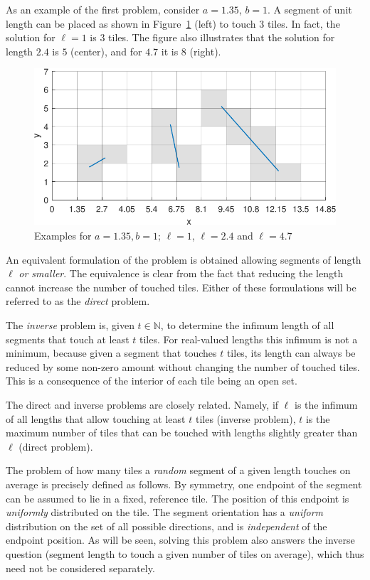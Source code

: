 \documentclass[12pt, a4paper]{article}
\newcommand{\len}{\ell} %
\newcommand{\tiles}{t} %
\begin{document}
As an example of the first problem, consider $a=1.35$, $b=1$. A segment of unit length can be placed as shown in Figure~\ref{fig: examples} (left) to touch $3$ tiles. In fact, the solution for $\len=1$ is $3$ tiles. The figure also illustrates that the solution for length $2.4$ is $5$ (center), and for $4.7$ it is $8$ (right).

\begin{figure}
\centering%
\includegraphics[width=.85\textwidth]{examples_1p35}%
\caption{Examples for $a=1.35, b=1$; $\len=1$, $\len=2.4$ and $\len=4.7$
}%
\label{fig: examples}%
\end{figure}%

An equivalent formulation of the problem is obtained allowing segments of length $\len$ \emph{or smaller}. The equivalence is clear from the fact that reducing the length cannot increase the number of touched tiles. Either of these formulations will be referred to as the \emph{direct} problem.

The \emph{inverse} problem is, given $\tiles \in \mathbb N$, to determine the infimum length of all segments that touch at least $\tiles$ tiles. For real-valued lengths this infimum is not a minimum, because given a segment that touches $\tiles$ tiles, its length can always be reduced by some non-zero amount without changing the number of touched tiles. This is a consequence of the interior of each tile being an open set.

The direct and inverse problems are closely related. Namely, if $\len$ is the infimum of all lengths that allow touching at least $\tiles$ tiles (inverse problem), $\tiles$ is the maximum number of tiles that can be touched with lengths slightly greater than $\len$ (direct problem).

The problem of how many tiles a \emph{random} segment of a given length touches on average is precisely defined as follows. By symmetry, one endpoint of the segment can be assumed to lie in a fixed, reference tile. The position of this endpoint is \emph{uniformly} distributed on the tile. The segment orientation has a \emph{uniform} distribution on the set of all possible directions, and is \emph{independent} of the endpoint position. As will be seen, solving this problem also answers the inverse question (segment length to touch a given number of tiles on average), which thus need not be considered separately. 
\end{document}
